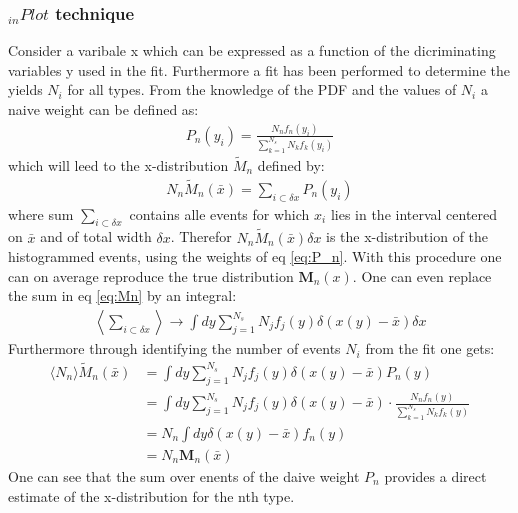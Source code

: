 \documentclass[english]{uzhpub}
\begin{document}
\subsubsection{$_{in} Plot$ technique}
Consider a varibale x which can be expressed as a function of the dicriminating variables y used in the fit. Furthermore a fit has been performed to determine the yields $N_i$ for all types. From the knowledge of the PDF and the values of $N_i$ a naive weight can be defined as:
\begin{align}
 P_n(y_i) = \frac{N_n f_n(y_i)}{\sum_{k=1}^{N_s} N_k f_k(y_i)} \label{eq:P_n}
\end{align}
which will leed to the x-distribution $\tilde{M}_n$ defined by:
\begin{align}
 N_n \tilde{M}_n (\bar{x}) = \sum_{i \subset \delta x} P_n (y_i) \label{eq:Mn}
\end{align}
where sum $\sum_{i \subset \delta x}$ contains alle events for which $x_i$ lies in the interval centered on $\bar{x}$ and of total width $\delta x$.
Therefor $N_n \tilde{M}_n (\bar{x}) \delta x$ is the x-distribution of the histogrammed events, using the weights of eq \ref{eq:P_n}.
With this procedure one can on average reproduce the true distribution $\textbf{M}_n(x)$. One can even replace the sum in eq \ref{eq:Mn} by an integral:
\begin{align}
 \left \langle \sum_{i \subset \delta x} \right \rangle \rightarrow \int dy \sum_{j=1}^{N_s} N_j f_j (y) \delta (x(y) - \bar{x}) \delta x \label{eq:average}
\end{align}
Furthermore through identifying the number of events $N_i$ from the fit one gets:
\begin{align}
 \langle N_n \rangle \tilde{M}_n (\bar{x}) & = \int dy \sum_{j=1}^{N_s} N_j f_j (y) \delta (x(y) - \bar{x}) P_n (y)                                               \\
                                           & = \int dy \sum_{j=1}^{N_s} N_j f_j (y) \delta (x(y)- \bar{x}) \cdot \frac{N_n f_n (y)}{\sum_{k=1}^{N_s} N_k f_k (y)} \\
                                           & = N_n \int dy \delta (x(y) - \bar{x}) f_n (y)                                                                        \\
                                           & = N_n \textbf{M}_n(\bar{x}) \label{eq:N_nM_n}
\end{align}
One can see that the sum over enents of the daive weight $P_n$ provides a direct estimate of the x-distribution for the nth type.
\end{document}
